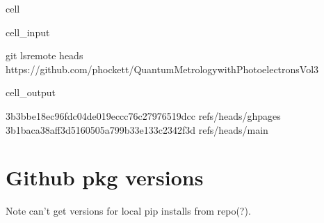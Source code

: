 \documentclass[letterpaper,table,10pt,english]{jupyterBook}
\begin{document}
\begin{sphinxuseclass}{cell}\begin{sphinxVerbatimInput}

\begin{sphinxuseclass}{cell_input}
\begin{sphinxVerbatim}[commandchars=\\\{\}]
git ls\PYGZhy{}remote \PYGZhy{}\PYGZhy{}heads https://github.com/phockett/Quantum\PYGZhy{}Metrology\PYGZhy{}with\PYGZhy{}Photoelectrons\PYGZhy{}Vol3
\end{sphinxVerbatim}

\end{sphinxuseclass}\end{sphinxVerbatimInput}
\begin{sphinxVerbatimOutput}

\begin{sphinxuseclass}{cell_output}
\begin{sphinxVerbatim}[commandchars=\\\{\}]
3b3bbe18ec96fdc04de019eccc76c27976519dcc	refs/heads/gh\PYGZhy{}pages
3b1baca38aff3d5160505a799b33e133c2342f3d	refs/heads/main
\end{sphinxVerbatim}

\end{sphinxuseclass}\end{sphinxVerbatimOutput}

\end{sphinxuseclass}

\section{Github pkg versions}
\label{\detokenize{tests/build_versions_checks:github-pkg-versions}}
\sphinxAtStartPar
Note \sphinxhyphen{} can’t get versions for local pip installs from repo(?).
\end{document}

